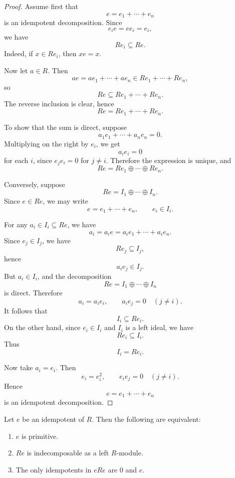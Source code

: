 \begin{proof}
    Assume first that
    \[
        e=e_1+\cdots+e_n
    \]
    is an idempotent decomposition. Since
    \[
        e_ie=ee_i=e_i,
    \]
    we have
    \[
        Re_i\subseteq Re.
    \]
    Indeed, if $x\in Re_i$, then $xe=x$.

    Now let $a\in R$. Then
    \[
        ae=ae_1+\cdots+ae_n\in Re_1+\cdots+Re_n,
    \]
    so
    \[
        Re\subseteq Re_1+\cdots+Re_n.
    \]
    The reverse inclusion is clear, hence
    \[
        Re=Re_1+\cdots+Re_n.
    \]

    To show that the sum is direct, suppose
    \[
        a_1e_1+\cdots+a_ne_n=0.
    \]
    Multiplying on the right by $e_i$, we get
    \[
        a_ie_i=0
    \]
    for each $i$, since $e_je_i=0$ for $j\ne i$. Therefore the expression is unique, and
    \[
        Re=Re_1\oplus\cdots\oplus Re_n.
    \]

    Conversely, suppose
    \[
        Re=I_1\oplus\cdots\oplus I_n.
    \]
    Since $e\in Re$, we may write
    \[
        e=e_1+\cdots+e_n,
        \qquad e_i\in I_i.
    \]

    For any $a_i\in I_i\subseteq Re$, we have
    \[
        a_i=a_ie=a_ie_1+\cdots+a_ie_n.
    \]
    Since $e_j\in I_j$, we have
    \[
        Re_j\subseteq I_j,
    \]
    hence
    \[
        a_ie_j\in I_j.
    \]
    But $a_i\in I_i$, and the decomposition
    \[
        Re=I_1\oplus\cdots\oplus I_n
    \]
    is direct. Therefore
    \[
        a_i=a_ie_i,
        \qquad
        a_ie_j=0 \quad (j\ne i).
    \]
    It follows that
    \[
        I_i\subseteq Re_i.
    \]
    On the other hand, since $e_i\in I_i$ and $I_i$ is a left ideal, we have
    \[
        Re_i\subseteq I_i.
    \]
    Thus
    \[
        I_i=Re_i.
    \]

    Now take $a_i=e_i$. Then
    \[
        e_i=e_i^2,
        \qquad
        e_ie_j=0 \quad (j\ne i).
    \]
    Hence
    \[
        e=e_1+\cdots+e_n
    \]
    is an idempotent decomposition.
\end{proof}

\begin{corollary}
    Let $e$ be an idempotent of $R$. Then the following are equivalent:
    \begin{enumerate}
        \renewcommand{\labelenumi}{(\theenumi)}
        \item $e$ is primitive.
        \item $Re$ is indecomposable as a left $R$-module.
        \item The only idempotents in $eRe$ are $0$ and $e$.
    \end{enumerate}
\end{corollary}

